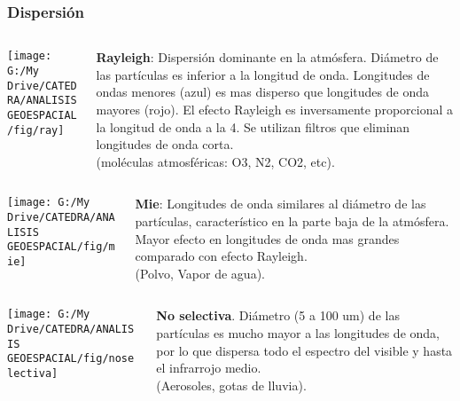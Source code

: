 \documentclass[14pt]{beamer}
\begin{document}
\begin{frame}
\frametitle{Dispersión}
  \begin{columns}
		\begin{column}{.3\linewidth}
		 \texttt{[image: G:/My Drive/CATEDRA/ANALISIS GEOESPACIAL/fig/ray]}
		\end{column}
		\begin{column}{.7\linewidth}
\scriptsize{\textbf{Rayleigh}: Dispersión dominante en la atmósfera. Diámetro de las partículas es inferior a la longitud de onda. Longitudes de ondas menores (azul) es mas disperso que longitudes de onda mayores (rojo). El efecto Rayleigh es inversamente proporcional a la longitud de onda a la 4. Se utilizan filtros que eliminan longitudes de onda corta.\\
(moléculas atmosféricas: O3, N2, CO2, etc)}.
		\end{column}
	\end{columns}
	\begin{columns}
		\begin{column}{.3\linewidth}
		 \texttt{[image: G:/My Drive/CATEDRA/ANALISIS GEOESPACIAL/fig/mie]}
		\end{column}
		\begin{column}{.7\linewidth}
\scriptsize{\textbf{Mie}: Longitudes de onda similares al diámetro de las partículas, característico en la parte baja de la atmósfera. Mayor efecto en longitudes de onda mas grandes comparado con efecto Rayleigh.\\
(Polvo, Vapor de agua).}
		\end{column}
	\end{columns}
	\begin{columns}
	 	\begin{column}{.3\linewidth}
		 \texttt{[image: G:/My Drive/CATEDRA/ANALISIS GEOESPACIAL/fig/noselectiva]}
		\end{column}
		\begin{column}{.7\linewidth}
\scriptsize{\textbf{No selectiva}. Diámetro (5  a 100 um) de las partículas es mucho mayor a las longitudes de onda, por lo que dispersa todo el espectro del visible y hasta el infrarrojo medio.\\
(Aerosoles, gotas de lluvia).}
		\end{column}
	\end{columns}
\end{frame}
\end{document}
